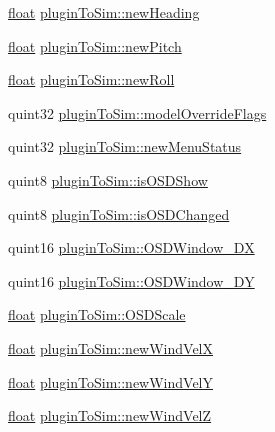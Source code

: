 \begin{DoxyCompactItemize}
\item 
\hyperlink{_super_l_u_support_8h_a6a1bb6ed41f44b60e7bd83b0e9945aa7}{float} \hyperlink{group___aero_sim_r_c_ga11677816070d9ac5bc78d2c45338c0ec}{plugin\-To\-Sim\-::new\-Heading}
\item 
\hyperlink{_super_l_u_support_8h_a6a1bb6ed41f44b60e7bd83b0e9945aa7}{float} \hyperlink{group___aero_sim_r_c_gae5174be9526399eb834a21d1d1e996d1}{plugin\-To\-Sim\-::new\-Pitch}
\item 
\hyperlink{_super_l_u_support_8h_a6a1bb6ed41f44b60e7bd83b0e9945aa7}{float} \hyperlink{group___aero_sim_r_c_ga83b167dd0c9161f47923432618fac9c4}{plugin\-To\-Sim\-::new\-Roll}
\item 
quint32 \hyperlink{group___aero_sim_r_c_ga0fc062ffe3e17dd8ae14a181fbb50c1f}{plugin\-To\-Sim\-::model\-Override\-Flags}
\item 
quint32 \hyperlink{group___aero_sim_r_c_ga17602d21cacd40328f97406fb577e7a7}{plugin\-To\-Sim\-::new\-Menu\-Status}
\item 
quint8 \hyperlink{group___aero_sim_r_c_ga35a2acc4730f500b87b19630f57c14ed}{plugin\-To\-Sim\-::is\-O\-S\-D\-Show}
\item 
quint8 \hyperlink{group___aero_sim_r_c_gaa416deb314c63406b7320311d1cf71d7}{plugin\-To\-Sim\-::is\-O\-S\-D\-Changed}
\item 
quint16 \hyperlink{group___aero_sim_r_c_gafd433a8e475af009c6214cddba668878}{plugin\-To\-Sim\-::\-O\-S\-D\-Window\-\_\-\-D\-X}
\item 
quint16 \hyperlink{group___aero_sim_r_c_gab8199d2a82d29980a0ec47ad7fced1e1}{plugin\-To\-Sim\-::\-O\-S\-D\-Window\-\_\-\-D\-Y}
\item 
\hyperlink{_super_l_u_support_8h_a6a1bb6ed41f44b60e7bd83b0e9945aa7}{float} \hyperlink{group___aero_sim_r_c_ga96db301b2cf97e19ccd774f1b93dad21}{plugin\-To\-Sim\-::\-O\-S\-D\-Scale}
\item 
\hyperlink{_super_l_u_support_8h_a6a1bb6ed41f44b60e7bd83b0e9945aa7}{float} \hyperlink{group___aero_sim_r_c_ga894c4529647383039436d227ab09ea6d}{plugin\-To\-Sim\-::new\-Wind\-Vel\-X}
\item 
\hyperlink{_super_l_u_support_8h_a6a1bb6ed41f44b60e7bd83b0e9945aa7}{float} \hyperlink{group___aero_sim_r_c_gaf7648b2c6048cddf0ba9fb68dfb55492}{plugin\-To\-Sim\-::new\-Wind\-Vel\-Y}
\item 
\hyperlink{_super_l_u_support_8h_a6a1bb6ed41f44b60e7bd83b0e9945aa7}{float} \hyperlink{group___aero_sim_r_c_gaa84a637360a4648e08d41632fb8f38c0}{plugin\-To\-Sim\-::new\-Wind\-Vel\-Z}
\item 

\end{DoxyCompactItemize}
